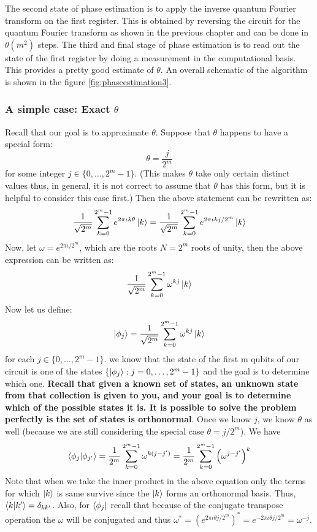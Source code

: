 The second state of phase estimation is to apply the inverse quantum Fourier transform on the first register. This is obtained by reversing the circuit for the quantum Fourier transform as shown in the previous chapter and can be done in $\theta(m^2)$ steps. The third and final stage of phase estimation is to read out the state of the first register by doing a measurement in the computational basis. This provides a pretty good estimate of $\theta$. An overall schematic of the algorithm is shown in the figure \ref{fig:phaseestimation3}.
\subsubsection{A simple case: Exact $\theta$ }
Recall that our goal is to approximate $\theta$. Suppose that $\theta$ happens to have a special form: 
\[ 
    \theta = \frac{j}{2^m}
\]
for some integer $j \in \{0,\ldots,2^{m}-1\}$. (This makes $\theta$ take only certain distinct values thus, in general, it is not correct to assume that $\theta$ has this form, but it is helpful to consider this case first.)
Then the above statement can be rewritten as:
\[
\frac{1}{\sqrt{2^m}}\sum_{k=0}^{2^m-1}e^{2\pi\iota k\theta}\ket{k}=\frac{1}{\sqrt{2^m}}\sum_{k=0}^{2^m-1}e^{2\pi\iota kj/2^m}\ket{k}
\]
Now, let $\omega=e^{2\pi\iota/2^m}$, which are the roots $N=2^m$ roots of unity, then the above expression can be written as:
\[
\frac{1}{\sqrt{2^m}}\sum_{k=0}^{2^m-1}\omega^{kj}\ket{k}
\]
Now let us define: 
\[
\ket{\phi_j}=\frac{1}{\sqrt{2^m}}\sum_{k=0}^{2^m-1}\omega^{kj}\ket{k}
\]
for each $j \in \{0,\ldots,2^m-1\}$. we know that the state of the first m qubits of our circuit is one of the states
$\{\ket{\phi_j}:j=0,\ldots,2^m-1\}$ and the goal is to determine which one. \textbf{Recall that given a known set of states, an unknown state from that collection is given to you, and your goal is to determine which of the possible states it is.
It is possible to solve the problem perfectly is the set of states is orthonormal}. Once we know $j$, we know $\theta$ as well (because we are still considering the special case $\theta=j/2^m$).
We have
\[
\braket{\phi_j|\phi_{j'}}=\frac{1}{2^m}\sum_{k=0}^{2^m-1}\omega^{k(j-j')}=\frac{1}{2^m}\sum_{k=0}^{2^m-1}\left(\omega^{j-j'}\right)^k
\]
Note that when we take the inner product in the above equation only the terms for which $\ket{k}$ is same survive since the $\ket{k}$ forms an orthonormal basis. Thus, $\braket{k|k'}=\delta_{kk'}$.
Also, for $\bra{\phi_j}$ recall that because of the conjugate transpose operation the $\omega$ will be conjugated and thus $\omega^{*}=\left(e^{2\pi\iota\theta j/2^m}\right)^*=e^{-2\pi\iota\theta j/2^m}=\omega^{-j}$.
